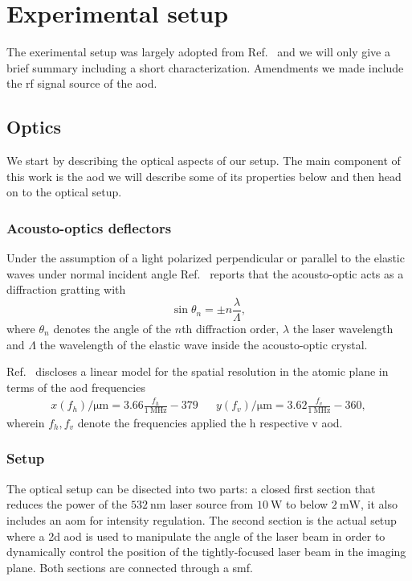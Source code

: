 \chapter{Experimental setup}\label{ch:experimental_setup}

The exerimental setup was largely adopted from Ref.~\cite{Hertlein2017} and we
will only give a brief summary including a short characterization. Amendments
we made include the \gls{rf} signal source of the \gls{aod}.

\section{Optics}

We start by describing the optical aspects of our setup. The main component
of this work is the \gls{aod} we will describe some of its properties below
and then head on to the optical setup.

\subsection{Acousto-optics deflectors}

Under the assumption of a light polarized perpendicular or parallel to the
elastic waves under normal incident angle Ref.~\cite{Royer1999} reports that
the acousto-optic acts as a diffraction gratting with
\begin{equation}
  \sin\theta_n=\pm n\frac{\lambda}{\Lambda}
  \label{eq:angle_gratting},
\end{equation}
where $\theta_n$ denotes the angle of the $n$th diffraction order, $\lambda$
the laser wavelength and $\Lambda$ the wavelength of the elastic wave inside
the acousto-optic crystal.

Ref.~\cite{Hertlein2017}
discloses a linear model for the spatial resolution in the atomic plane in
terms of the \gls{aod} frequencies
\begin{align}
  x(f_h)/\si{\micro\meter}=3.66\frac{f_h}{\SI{1}{\mega\hertz}}-379 &&
  y(f_v)/\si{\micro\meter}=3.62\frac{f_v}{\SI{1}{\mega\hertz}}-360
  \label{eq:spatial_position_frequency},
\end{align}
wherein $f_h,f_v$ denote the frequencies applied the \gls{h} respective
\gls{v} \gls{aod}.

\subsection{Setup}

The optical setup can be disected into two parts: a closed first section that
reduces the power of the $\SI{532}{\nano\meter}$ laser source from
$\SI{10}{\watt}$ to below $\SI{2}{\milli\watt}$, it also includes an \gls{aom}
for intensity regulation. The second section is the actual setup where a
\gls{2d} \gls{aod} is used to manipulate the angle of the laser beam in order
to dynamically control the position of the tightly-focused laser beam in the
imaging plane. Both sections are connected through a \gls{smf}.

